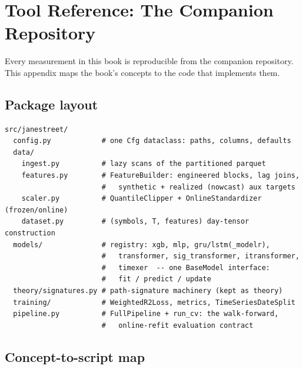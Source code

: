 \chapter{Tool Reference: The Companion Repository}
\label{app:tools}

Every measurement in this book is reproducible from the companion
repository. This appendix maps the book's concepts to the code that
implements them.

\section*{Package layout}

\begin{lstlisting}
src/janestreet/
  config.py            # one Cfg dataclass: paths, columns, defaults
  data/
    ingest.py          # lazy scans of the partitioned parquet
    features.py        # FeatureBuilder: engineered blocks, lag joins,
                       #   synthetic + realized (nowcast) aux targets
    scaler.py          # QuantileClipper + OnlineStandardizer (frozen/online)
    dataset.py         # (symbols, T, features) day-tensor construction
  models/              # registry: xgb, mlp, gru/lstm(_modelr),
                       #   transformer, sig_transformer, itransformer,
                       #   timexer  -- one BaseModel interface:
                       #   fit / predict / update
  theory/signatures.py # path-signature machinery (kept as theory)
  training/            # WeightedR2Loss, metrics, TimeSeriesDateSplit
  pipeline.py          # FullPipeline + run_cv: the walk-forward,
                       #   online-refit evaluation contract
\end{lstlisting}

\section*{Concept-to-script map}

